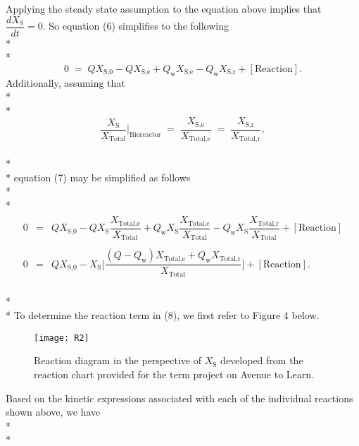 \documentclass[]{article}
\begin{document}
Applying the steady state assumption to the equation above implies that $\dfrac{dX_{\text{S}}}{dt}=0$. So equation (6) simplifies to the following \\* \\* 
\begin{equation}
0 \; = \; QX_{\text{S,0}} - QX_{\text{S,e}} + Q_{\text{w}}X_{\text{S,e}} - Q_{\text{w}}X_{\text{S,r}} + [\text{Reaction}].
\end{equation}
Additionally, assuming that \\* \\* 
\begin{equation}
\nonumber
\dfrac{X_{\text{S}}}{X_{\text{Total}}}\biggr\rvert_{\text{Bioreactor}} \; = \; \dfrac{X_{\text{S,e}}}{X_{\text{Total,e}}} \; = \; \dfrac{X_{\text{S,r}}}{X_{\text{Total,r}}}, 
\end{equation} \\* \\* 
equation (7) may be simplified as follows \\* \\* 
\begin{align}
\begin{array}{rcl}
0 &=& QX_{\text{S,0}} - QX_{\text{S}}\dfrac{X_{\text{Total,e}}}{X_{\text{Total}}} + Q_{\text{w}}X_{\text{S}}\dfrac{X_{\text{Total,e}}}{X_{\text{Total}}} - Q_{\text{w}}X_{\text{S}}\dfrac{X_{\text{Total,r}}}{X_{\text{Total}}} + [\text{Reaction}] \\ \\
0 &=& QX_{\text{S,0}} - X_{\text{S}} \Bigg[\dfrac{(Q-Q_{\text{w}})X_{\text{Total,e}} + Q_{\text{w}}X_{\text{Total,r}}}{X_{\text{Total}}}\Bigg] + [\text{Reaction}].
\end{array}
\end{align} \\* \\*
To determine the reaction term in (8), we first refer to Figure 4 below.
	\vspace{0.25cm}
\begin{figure}[H]
	\centering
	\texttt{[image: R2]}
	\caption{Reaction diagram in the perspective of $X_{\text{S}}$ developed from the reaction chart provided for the term project on Avenue to Learn.} 
\end{figure} 
\vspace{0.25cm} 
\noindent Based on the kinetic expressions associated with each of the individual reactions shown above, we have \\* \\* 
\end{document}
